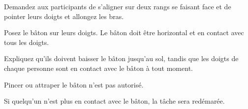 \documentclass{grand-jeu}
\begin{document}
\begin{liste-materiel}
\end{liste-materiel}

\begin{regles}
Demandez aux participants de s’aligner sur deux rangs se faisant face et de pointer leurs doigts et allongez les bras.

Posez le bâton sur leurs doigts. Le bâton doit être horizontal et en contact avec tous les doigts.

Expliquez qu’ils doivent baisser le bâton jusqu’au sol, tandis que les doigts de chaque personne sont en contact avec le bâton à tout moment.

Pincer ou attraper le bâton n’est pas autorisé.

Si quelqu’un n’est plus en contact avec le bâton, la tâche sera redémarée.
\end{regles}

\begin{moments-stop}
\end{moments-stop}
\end{document}
